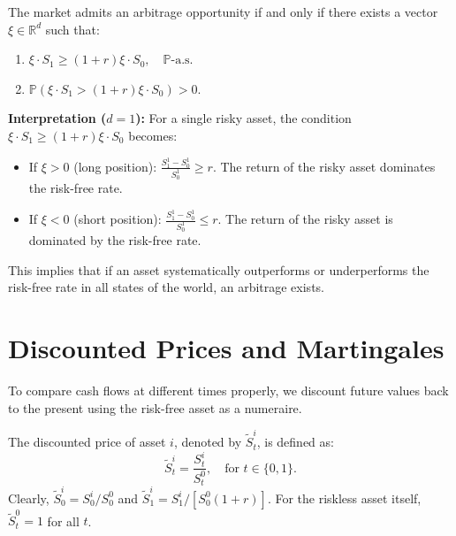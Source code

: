 \begin{proposition}
The market admits an arbitrage opportunity if and only if there exists a vector $\xi \in \mathbb{R}^d$ such that:
\begin{enumerate}
    \item $\xi \cdot S_1 \ge (1+r) \xi \cdot S_0, \quad \mathbb{P}\text{-a.s.}$
    \item $\mathbb{P}(\xi \cdot S_1 > (1+r) \xi \cdot S_0) > 0$.
\end{enumerate}
\end{proposition}

\textbf{Interpretation ($d=1$):}
For a single risky asset, the condition $\xi \cdot S_1 \ge (1+r) \xi \cdot S_0$ becomes:
\begin{itemize}
    \item If $\xi > 0$ (long position): $\frac{S_1^1 - S_0^1}{S_0^1} \ge r$. The return of the risky asset dominates the risk-free rate.
    \item If $\xi < 0$ (short position): $\frac{S_1^1 - S_0^1}{S_0^1} \le r$. The return of the risky asset is dominated by the risk-free rate.
\end{itemize}
This implies that if an asset systematically outperforms or underperforms the risk-free rate in all states of the world, an arbitrage exists.

\section{Discounted Prices and Martingales}

To compare cash flows at different times properly, we discount future values back to the present using the risk-free asset as a numeraire.

\begin{definition}
The discounted price of asset $i$, denoted by $\tilde{S}^i_t$, is defined as:
\begin{equation}
    \tilde{S}_t^i = \frac{S_t^i}{S_t^0}, \quad \text{for } t \in \{0, 1\}.
\end{equation}
Clearly, $\tilde{S}_0^i = S_0^i / S_0^0$ and $\tilde{S}_1^i = S_1^i / [S_0^0(1+r)]$.
For the riskless asset itself, $\tilde{S}_t^0 = 1$ for all $t$.
\end{definition}

